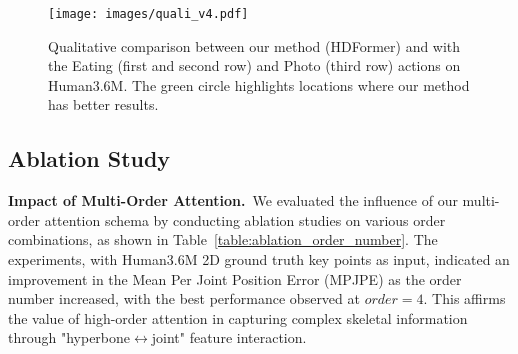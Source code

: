 \documentclass{article}
\begin{document}
\begin{figure}[!t]
    \centering
    \texttt{[image: images/quali\_v4.pdf]}
    \vspace{-10mm}
    \caption{\small Qualitative comparison between our method (HDFormer) and \protect\cite{ZhangCVPR22MixSTE} with the Eating (first and second row) and Photo (third row) actions on Human3.6M. The green circle highlights locations where our method has better results.}
    \vspace{2mm}
    \label{fig:vis_compare}
\end{figure}


\subsection{Ablation Study}

\noindent \textbf{Impact of Multi-Order Attention.}~We evaluated the influence of our multi-order attention schema by conducting ablation studies on various order combinations, as shown in Table~\ref{table:ablation_order_number}. The experiments, with Human3.6M 2D ground truth key points as input, indicated an improvement in the Mean Per Joint Position Error (MPJPE) as the order number increased, with the best performance observed at $order=4$. This affirms the value of high-order attention in capturing complex skeletal information through "hyperbone$\leftrightarrow$joint" feature interaction.

\begin{table}
    \centering
    \scriptsize
    \caption{\small Ablation study of the order number. We compared the results of different orders involved in the high-order attention transformer block in Human3.6M with ground truth as input.}
    \vspace{-0.1in}
    \label{table:ablation_order_number}
    \vspace{-4mm}
\end{table}
\end{document}
